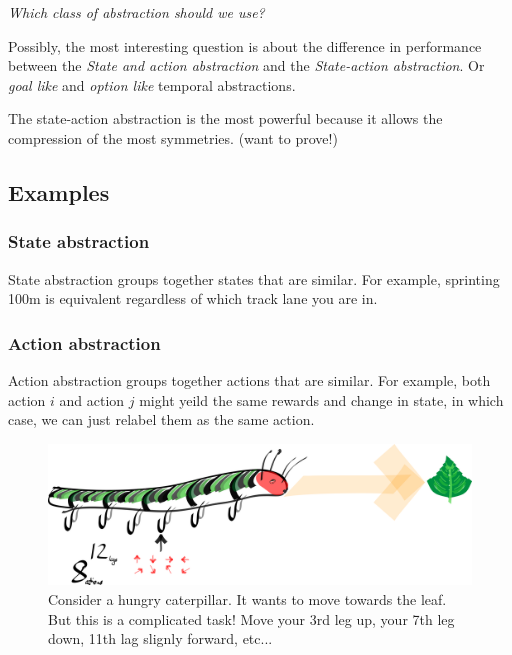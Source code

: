 \begin{displayquote}
\textit{Which class of abstraction should we use?}
\end{displayquote}

Possibly, the most interesting question is about the difference in performance between
the \textit{State and action abstraction} and the \textit{State-action abstraction}.
Or \textit{goal like} and \textit{option like} temporal abstractions.

The state-action abstraction is the most powerful because it allows the compression of the most symmetries. (want to
prove!)

\subsection{Examples}

\subsubsection{State abstraction}

State abstraction groups together states that are similar. For example,
sprinting 100m is equivalent regardless of which track lane you are in.



\subsubsection{Action abstraction}

Action abstraction groups together actions that are similar. For
example, both action $i$ and action $j$ might yeild the same rewards and change in state,
in which case, we can just relabel them as the same action.

\begin{figure}[h!]
\centering
\includegraphics[width=\textwidth,height=0.25\textheight]{../../pictures/drawings/hungry-caterpillar.png}
\caption{Consider a hungry caterpillar. It wants to move towards the leaf. But this is a complicated task! Move your 3rd leg up, your 7th leg down, 11th lag slignly forward, etc...}
\end{figure}


